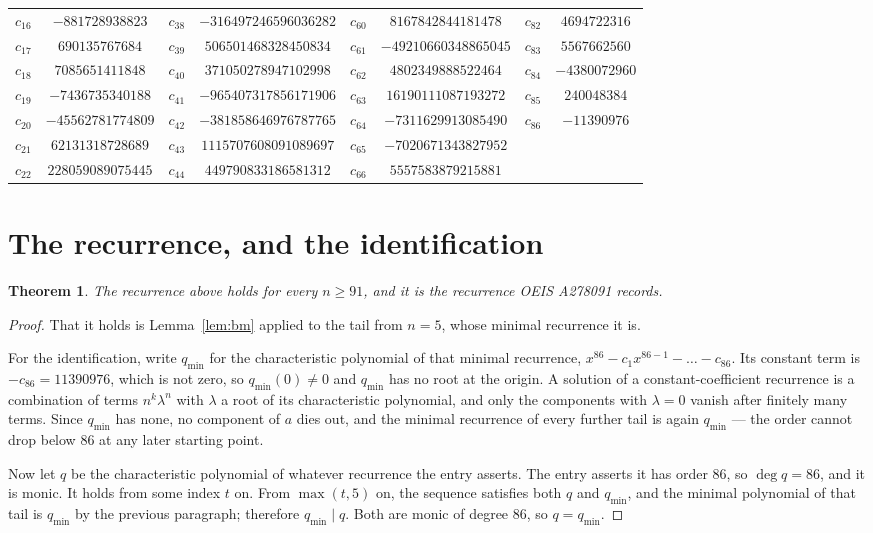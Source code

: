 \documentclass[11pt,a4paper]{article}
\theoremstyle{plain}
\newtheorem{theorem}{Theorem}
\theoremstyle{definition}
\begin{document}
\begin{center}
\begin{tabular}{cccccccc}
$c_{16}$ & $-881728938823$ & $c_{38}$ & $-316497246596036282$ & $c_{60}$ & $8167842844181478$ & $c_{82}$ & $4694722316$ \\
$c_{17}$ & $690135767684$ & $c_{39}$ & $506501468328450834$ & $c_{61}$ & $-49210660348865045$ & $c_{83}$ & $5567662560$ \\
$c_{18}$ & $7085651411848$ & $c_{40}$ & $371050278947102998$ & $c_{62}$ & $4802349888522464$ & $c_{84}$ & $-4380072960$ \\
$c_{19}$ & $-7436735340188$ & $c_{41}$ & $-965407317856171906$ & $c_{63}$ & $16190111087193272$ & $c_{85}$ & $240048384$ \\
$c_{20}$ & $-45562781774809$ & $c_{42}$ & $-381858646976787765$ & $c_{64}$ & $-7311629913085490$ & $c_{86}$ & $-11390976$ \\
$c_{21}$ & $62131318728689$ & $c_{43}$ & $1115707608091089697$ & $c_{65}$ & $-7020671343827952$ &  &  \\
$c_{22}$ & $228059089075445$ & $c_{44}$ & $449790833186581312$ & $c_{66}$ & $5557583879215881$ &  &  \\
\end{tabular}
\end{center}

\section{The recurrence, and the identification}

\begin{theorem}
The recurrence above holds for every $n\ge91$, and it is the recurrence OEIS A278091 records.
\end{theorem}

\begin{proof}
That it holds is Lemma~\ref{lem:bm} applied to the tail from $n=5$, whose minimal
recurrence it is.

For the identification, write $q_{\min}$ for the characteristic polynomial of that minimal
recurrence, $x^{86}-c_1x^{86-1}-\dots-c_{86}$. Its constant term is
$-c_{86}=11390976$, which is not zero, so $q_{\min}(0)\neq0$ and $q_{\min}$ has no
root at the origin. A solution of a constant-coefficient recurrence is a combination of terms
$n^{k}\lambda^{n}$ with $\lambda$ a root of its characteristic polynomial, and only the
components with $\lambda=0$ vanish after finitely many terms. Since $q_{\min}$ has none, no
component of $a$ dies out, and the minimal recurrence of every further tail is again
$q_{\min}$ --- the order cannot drop below $86$ at any later starting point.

Now let $q$ be the characteristic polynomial of whatever recurrence the entry asserts. The
entry asserts it has order $86$, so $\deg q=86$, and it is monic. It holds from some
index $t$ on. From $\max(t,5)$ on, the sequence satisfies both $q$ and $q_{\min}$, and
the minimal polynomial of that tail is $q_{\min}$ by the previous paragraph; therefore
$q_{\min}\mid q$. Both are monic of degree $86$, so $q=q_{\min}$.
\end{proof}
\end{document}
